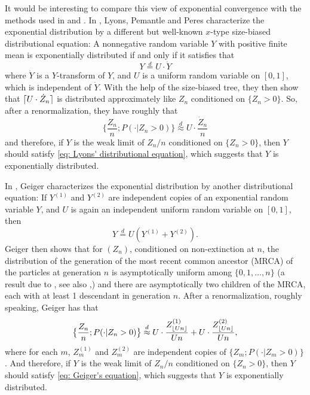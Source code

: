 \documentclass[12pt,a4paper]{amsart}
\DeclarePairedDelimiter\ceil{\lceil}{\rceil}
\DeclarePairedDelimiter\floor{\lfloor}{\rfloor}
\numberwithin{equation}{section}
\begin{document}
	It would be interesting to compare this view of exponential convergence with the methods used in \cite{geiger2000new} and \cite{lyons1995conceptual}.
	In \cite{lyons1995conceptual}, Lyons, Pemantle and Peres characterize the exponential distribution by a different 
but well-known $x$-type size-biased distributional equation:
	A nonnegative random variable $Y$ with positive finite mean is exponentially distributed if and only if it satisfies that
\begin{equation}
\label{eq: Lyons' distributional equation}
		Y 		\overset{d}= U \cdot \dot Y
\end{equation}
   where $\dot Y$ is a $Y$-transform of $Y$,  and $U$ is a uniform random variable on 
$[0,1]$, which is independent of $\dot Y$.
    With the help of the size-biased tree, they then show that $\ceil{U \cdot \dot Z_n}$ is distributed approximately like $Z_n$ conditioned on $\{Z_n > 0\}$.
	So, after a renormalization, they have roughly that
\begin{equation}
\label{eq: Lyons' insight}
	\big\{\frac{Z_n}{n} ; P(  \cdot| Z_n > 0) \big\}
	\overset{d}{\approx} U \cdot \frac{ \dot Z_n}{n}
\end{equation}
	and therefore, if $Y$ is the weak limit of $Z_n/n$ conditioned on $\{Z_n > 0\}$,
	then $Y$ should satisfy \eqref{eq: Lyons' distributional equation}, which suggests that $Y$ is exponentially distributed.
	
	In \cite{geiger2000new}, Geiger characterizes the exponential distribution by another distributional equation:
		If $Y^{(1)}$ and $Y^{(2)}$ are independent copies of an exponential random variable $Y$, and $U$ is again an independent uniform random variable on $[0,1]$, then
\begin{equation}
\label{eq: Geiger's equation}
	Y	\overset{d} = U (Y^{(1)} + Y^{(2)}).
\end{equation}
	Geiger then shows that for $(Z_n)$, conditioned on non-extinction at $n$, 
	the distribution of the generation of the most recent common ancestor (MRCA) of the particles at generation $n$ is asymptotically uniform among $\{0,1,\dots,n\}$ (a result due to \cite{Zubkov1975}, see also \cite{geiger1999elementary},) and there are asymptotically two children of 
the MRCA, each with at least 1 descendant in generation $n$.
	After a renormalization, roughly speaking, Geiger has that
\begin{equation}
\label{eq: Geiger's insight}
	\big\{\frac{Z_n}{n} ; P(  \cdot| Z_n > 0) \big\}
		\overset{d}{\approx} U \cdot \frac{ Z^{(1)}_{  \floor{Un}  }}{Un} + U \cdot \frac{ Z^{(2)}_{ \floor{Un} }}{Un} ,
\end{equation}
	where for each $m$, $Z_m^{(1)}$ and $Z_m^{(2)}$ are independent copies of $\{Z_m; P(\cdot | Z_m > 0)\}$.
	And therefore, if $Y$ is the weak limit of $Z_n/n$ conditioned on $\{Z_n > 0\}$, then $Y$ should satisfy \eqref{eq: Geiger's equation}, which suggests that $Y$ is exponentially distributed.
	
\end{document}
